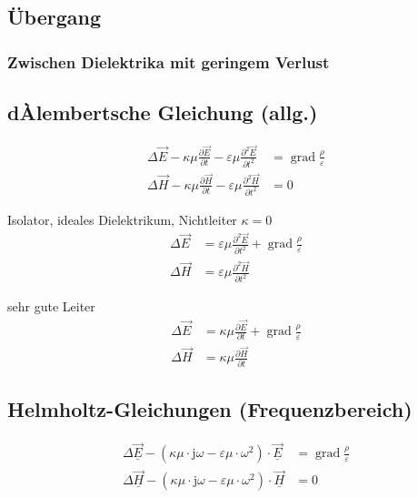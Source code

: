\subsection{Übergang}
\subsubsection{Zwischen Dielektrika mit geringem Verlust}

\subsection{dÀlembertsche Gleichung (allg.)}

\begin{align*}
    \Delta \vec{E}-\kappa \mu \frac{\partial \vec{E}}{\partial t}-\varepsilon \mu \frac{\partial^{2} \vec{E}}{\partial t^{2}} & = \operatorname{grad} \frac{\rho}{\varepsilon} \\
    \Delta \vec{H}-\kappa \mu \frac{\partial \vec{H}}{\partial t}-\varepsilon \mu \frac{\partial^{2} \vec{H}}{\partial t^{2}} & = 0
\end{align*}

Isolator, ideales Dielektrikum, Nichtleiter $\kappa = 0$
\begin{align*}
    \Delta \vec{E} & =\varepsilon \mu \frac{\partial^{2} \vec{E}}{\partial t^{2}}+\operatorname{grad} \frac{\rho}{\varepsilon} \\
    \Delta \vec{H} & =\varepsilon \mu \frac{\partial^{2} \vec{H}}{\partial t^{2}}
\end{align*}

sehr gute Leiter
\begin{align*}
    \Delta \vec{E} & =\kappa \mu \frac{\partial \vec{E}}{\partial t}+\operatorname{grad} \frac{\rho}{\varepsilon} \\
    \Delta \vec{H} & =\kappa \mu \frac{\partial \vec{H}}{\partial t}
\end{align*}

\subsection{Helmholtz-Gleichungen (Frequenzbereich)}
\begin{align*}
    \Delta \underline{\vec{E}}-\left(\kappa \mu \cdot \mathrm{j} \omega-\varepsilon \mu \cdot \omega^{2}\right) \cdot \underline{\vec{E}} & = \operatorname{grad} \frac{\rho}{\varepsilon} \\
    \Delta \underline{\vec{H}}-\left(\kappa \mu \cdot \mathrm{j} \omega-\varepsilon \mu \cdot \omega^{2}\right) \cdot \underline{\vec{H}} & = 0
\end{align*}

